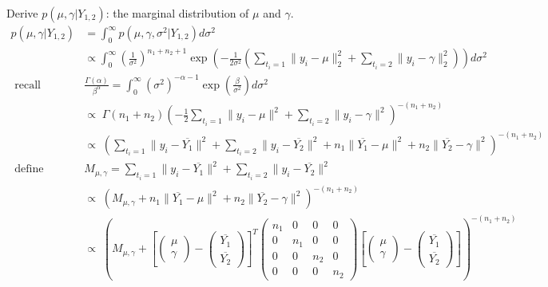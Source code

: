 \documentclass[12pt,letterpaper,twoside]{article}
\begin{document}
\begin{enumerate}[label=(\alph*)]
    Derive $p(\mu, \gamma|Y_{1,2})$: the marginal distribution of $\mu$ and $\gamma$.
    \begin{align*}
        p(\mu, \gamma|Y_{1,2}) & = \int_0^{\infty} p(\mu, \gamma, \sigma^2|Y_{1,2}) d\sigma^2 \\
            & \propto \int_0^{\infty} \left(\frac{1}{\sigma^2}\right)^{n_1+n_2+1} \exp\left(-\frac{1}{2\sigma^2}(\sum_{t_i=1} \|y_i-\mu\|^2_2 + \sum_{t_i=2} \|y_i-\gamma\|^2_2)\right) d\sigma^2 \\
        \textrm{ recall  }& \frac{\Gamma(\alpha)}{\beta^\alpha} = \int_0^\infty (\sigma^2)^{-\alpha - 1} \exp\left(\frac{\beta}{\sigma^2}\right)d\sigma^2\\
            & \propto \; \Gamma(n_1 + n_2) \left(-\frac{1}{2}  \sum_{t_i=1} \lVert y_i - \mu\rVert^2 + \sum_{t_i=2}\lVert y_i - \gamma \rVert^2\right)^{-(n_1 + n_2)} \\
            & \propto \; (\sum_{t_i=1}\lVert y_i - \overline{Y_1} \rVert^2 + \sum_{t_i=2}\lVert y_i - \overline{Y_2} \rVert^2 + n_1\lVert \overline{Y_1} - \mu \rVert^2 + n_2\lVert \overline{Y_2} - \gamma \rVert^2)^{-(n_1 + n_2)}\\
        \textrm{ define  }& M_{\mu, \gamma} = \sum_{t_i=1}\lVert y_i - \overline{Y_1} \rVert^2 + \sum_{t_i=2}\lVert y_i - \overline{Y_2} \rVert^2\\
            & \propto \; (M_{\mu, \gamma} + n_1\lVert \overline{Y_1} - \mu \rVert^2 + n_2\lVert \overline{Y_2} - \gamma \rVert^2)^{-(n_1 + n_2)}\\
            & \propto \; \left(M_{\mu, \gamma} + \left[\left(\begin{matrix}\mu\\ \gamma\end{matrix}\right) - \left(\begin{matrix*}\overline{Y_1}\\ \overline{Y_2}\end{matrix*}\right)\right]^T \left(\begin{matrix*} n_1 & 0 & 0 & 0 \\ 0 & n_1 & 0 & 0 \\ 0 & 0 & n_2 & 0 \\ 0 & 0 & 0 & n_2 \end{matrix*}\right) \left[\left(\begin{matrix}\mu\\ \gamma\end{matrix}\right) - \left(\begin{matrix*}\overline{Y_1}\\ \overline{Y_2}\end{matrix*}\right)\right]\right)^{-(n_1 + n_2)}\\

\end{align*}
\end{enumerate}
\end{document}
